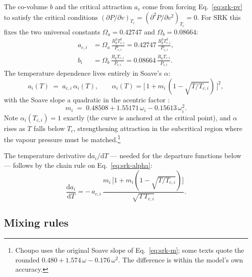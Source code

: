 \documentclass[11pt,a4paper]{article}
\newcommand{\Rgas}{R_{\!\mathrm{g}}}                %
\begin{document}
The co-volume $b$ and the critical attraction $a_c$ come from forcing
Eq.~\eqref{eq:srk-pv} to satisfy the critical conditions
$(\partial P/\partial v)_{T_c} = (\partial^2 P/\partial
v^2)_{T_c} = 0$.  For SRK this fixes the two universal constants
$\Omega_a = 0.42747$ and $\Omega_b = 0.08664$:
\begin{align}
   a_{c,i} &= \Omega_a\,\frac{\Rgas^2 T_{c,i}^2}{P_{c,i}}
            = 0.42747\,\frac{\Rgas^2 T_{c,i}^2}{P_{c,i}},
            \label{eq:srk-ac}\\[2pt]
   b_i     &= \Omega_b\,\frac{\Rgas T_{c,i}}{P_{c,i}}
            = 0.08664\,\frac{\Rgas T_{c,i}}{P_{c,i}}.
            \label{eq:srk-b}
\end{align}
The temperature dependence lives entirely in Soave's $\alpha$:
\begin{equation}
   a_i(T) \;=\; a_{c,i}\,\alpha_i(T),
   \qquad
   \alpha_i(T) = \bigl[\,1 + m_i\,(1 - \sqrt{T/T_{c,i}})\,\bigr]^2,
   \label{eq:srk-alpha}
\end{equation}
with the Soave slope a quadratic in the acentric factor
\cite{Soave1972}:
\begin{equation}
   m_i \;=\; 0.48508 + 1.55171\,\omega_i - 0.15613\,\omega_i^2 .
   \label{eq:srk-m}
\end{equation}
Note $\alpha_i(T_{c,i}) = 1$ exactly (the curve is anchored at the
critical point), and $\alpha$ rises as $T$ falls below $T_c$,
strengthening attraction in the subcritical region where the vapour
pressure must be matched.\footnote{Choupo uses the original Soave
slope of Eq.~\eqref{eq:srk-m}; some texts quote the rounded
$0.480 + 1.574\,\omega - 0.176\,\omega^2$.  The difference is within
the model's own accuracy.}

The temperature derivative $\mathrm{d}a_i/\mathrm{d}T$ --- needed
for the departure functions below --- follows by the chain rule on
Eq.~\eqref{eq:srk-alpha}:
\begin{equation}
   \frac{\mathrm{d}a_i}{\mathrm{d}T}
   = -\,a_{c,i}\,\frac{m_i\,\bigl[1 + m_i(1-\sqrt{T/T_{c,i}})\bigr]}
                       {\sqrt{T\,T_{c,i}}}.
   \label{eq:srk-dadT}
\end{equation}

\subsection{Mixing rules}
\end{document}
